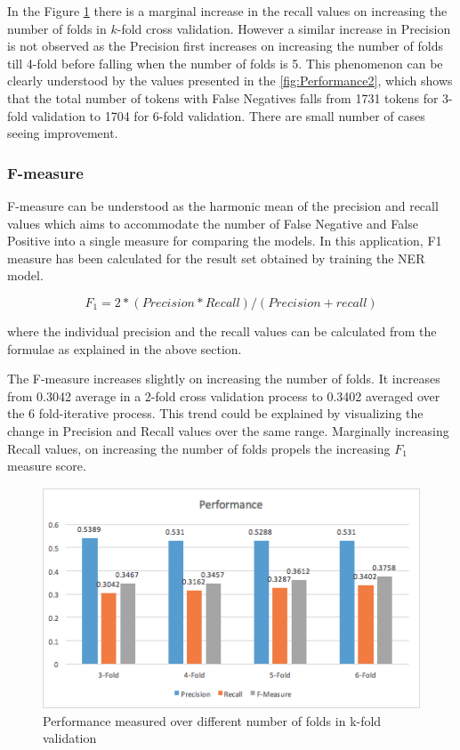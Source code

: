 \documentclass{sig-alternate-05-2015}
\begin{document}
In the Figure \ref{fig:Performance1} there is a marginal increase in the recall values on increasing the number of folds in $k$-fold cross validation. However a similar increase in Precision is not observed as the Precision first increases on increasing the number of folds till 4-fold before falling when the number of folds is 5. This phenomenon can be clearly understood by the values presented in the \ref{fig:Performance2}, which shows that the total number of tokens with False Negatives falls from 1731 tokens for 3-fold validation to 1704 for 6-fold validation. There are small number of cases seeing improvement.


\subsubsection{F-measure}
F-measure can be understood as the harmonic mean of the precision and recall values which aims to accommodate the number of False Negative and False Positive into a single measure for comparing the models. In this application, F1 measure has been calculated for the result set obtained by training the NER model.

\begin{equation}
F_1 = 2*(Precision*Recall)/(Precision+recall)
\end{equation}

where the individual precision and the recall values can be calculated from the formulae as explained in the above section.

The F-measure increases slightly on increasing the number of folds. It increases from 0.3042 average in a 2-fold cross validation process to 0.3402 averaged over the 6 fold-iterative process. This trend could be explained by visualizing the change in Precision and Recall values over the same range. Marginally increasing Recall values, on increasing the number of folds propels the increasing $F_1$ measure score.

\begin{figure}
\centering
  \includegraphics[width=\linewidth]{Performance1.png}
  \caption{Performance measured over different number of folds in k-fold validation}
  \label{fig:Performance1}
\end{figure}
\end{document}
